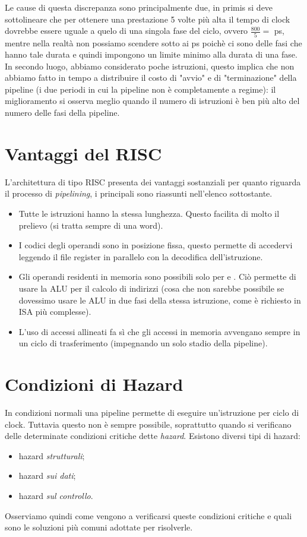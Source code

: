 \documentclass[class=book, crop=false, oneside]{standalone}
\begin{document}
Le cause di questa discrepanza sono principalmente due, in primis si deve sottolineare che per ottenere una prestazione 5 volte più alta il tempo di clock dovrebbe essere uguale a quelo di una singola fase del ciclo, ovvero \(\frac{800}{5}=\) \unit[160]{ps}, mentre nella realtà non possiamo scendere sotto ai \unit[200]{ps} poichè ci sono delle fasi che hanno tale durata e quindi impongono un limite minimo alla durata di una fase. In secondo luogo, abbiamo considerato poche istruzioni, questo implica che non abbiamo fatto in tempo a distribuire il costo di "avvio" e di "terminazione" della pipeline (i due periodi in cui la pipeline non è completamente a regime): il miglioramento si osserva meglio quando il numero di istruzioni è ben più alto del numero delle fasi della pipeline.

\section{Vantaggi del RISC}
L'architettura di tipo RISC presenta dei vantaggi sostanziali per quanto riguarda il processo di \emph{pipelining}, i principali sono riassunti nell'elenco sottostante.
\begin{itemize}
	\item Tutte le istruzioni hanno la stessa lunghezza. Questo facilita di molto il prelievo (si tratta sempre di una word).
	\item I codici degli operandi sono in posizione fissa, questo permette di accedervi leggendo il file register in parallelo con la decodifica dell’istruzione.
	\item Gli operandi residenti in memoria sono possibili solo per  e . Ciò permette di usare la ALU per il calcolo di indirizzi (cosa che non sarebbe possibile se dovessimo usare le ALU in due fasi della stessa istruzione, come è richiesto in ISA più complesse).
	\item  L’uso di accessi allineati fa sì che gli accessi in memoria avvengano sempre in un ciclo di trasferimento (impegnando un solo stadio della pipeline).
\end{itemize}

\section{Condizioni di Hazard}
In condizioni normali una pipeline permette di eseguire un'istruzione per ciclo di clock. Tuttavia questo non è sempre possibile, soprattutto quando si verificano delle determinate condizioni critiche dette \emph{hazard}. Esistono diversi tipi di hazard:
\begin{itemize}
	\item hazard \emph{strutturali};
	\item hazard \emph{sui dati};
	\item hazard \emph{sul controllo}.
\end{itemize}
Osserviamo quindi come vengono a verificarsi queste condizioni critiche e quali sono le soluzioni più comuni adottate per risolverle.
\end{document}
